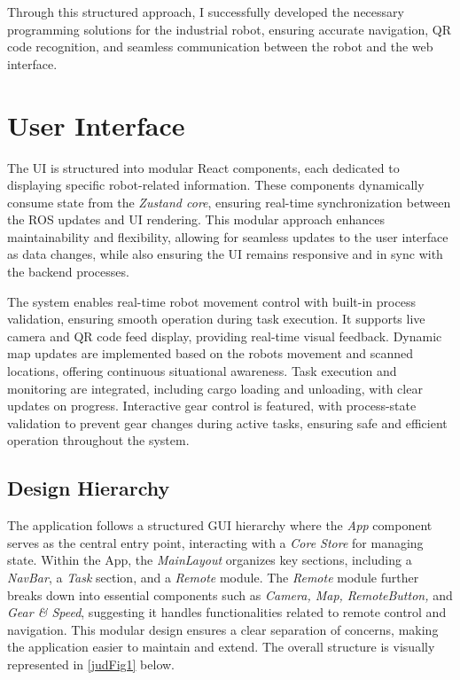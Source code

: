 \documentclass[a4paper,12pt]{extreport}
\begin{document}
Through this structured approach, I successfully developed the necessary
programming solutions for the industrial robot, ensuring accurate
navigation, QR code recognition, and seamless communication between the
robot and the web interface.

\section{User Interface}
The UI is structured into modular React components, each dedicated to
displaying specific robot-related information. These components
dynamically consume state from the \emph{Zustand core}, ensuring
real-time synchronization between the ROS updates and UI rendering. This
modular approach enhances maintainability and flexibility, allowing for
seamless updates to the user interface as data changes, while also
ensuring the UI remains responsive and in sync with the backend
processes.

The system enables real-time robot movement control with built-in
process validation, ensuring smooth operation during task execution. It
supports live camera and QR code feed display, providing real-time
visual feedback. Dynamic map updates are implemented based on the
robot\textquotesingle s movement and scanned locations, offering
continuous situational awareness. Task execution and monitoring are
integrated, including cargo loading and unloading, with clear updates on
progress. Interactive gear control is featured, with process-state
validation to prevent gear changes during active tasks, ensuring safe
and efficient operation throughout the system.

\subsection{Design Hierarchy}

The application follows a structured GUI hierarchy where the \emph{App}
component serves as the central entry point, interacting with a
\emph{Core Store} for managing state. Within the App, the
\emph{MainLayout} organizes key sections, including a \emph{NavBar}, a
\emph{Task} section, and a \emph{Remote} module. The \emph{Remote}
module further breaks down into essential components such as
\emph{Camera, Map, RemoteButton,} and \emph{Gear \& Speed}, suggesting
it handles functionalities related to remote control and navigation.
This modular design ensures a clear separation of concerns, making the
application easier to maintain and extend. The overall structure is
visually represented in \cref{judFig1} below.
\end{document}
